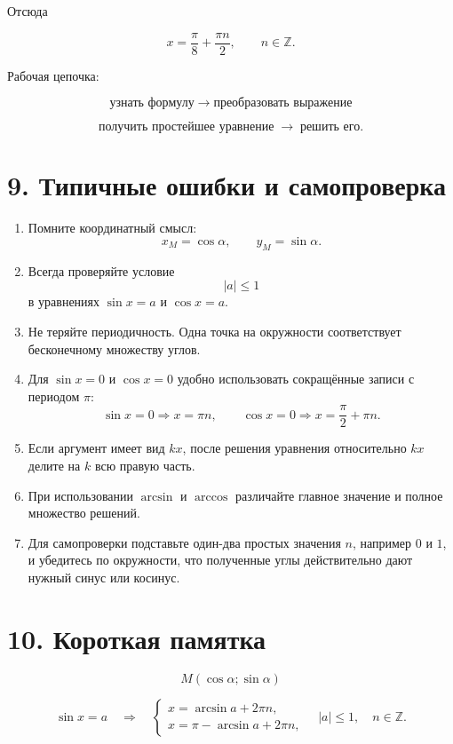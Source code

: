 \documentclass[a4paper,12pt]{article}
\newcommand{\Z}{\mathbb{Z}}
\begin{document}
Отсюда

\[
\boxed{x=\frac{\pi}{8}+\frac{\pi n}{2},
\qquad n\in\Z.}
\]

Рабочая цепочка:

\[
\text{узнать формулу}
\;\longrightarrow\;
\text{преобразовать выражение}
\]

\[
\text{получить простейшее уравнение}
\;\longrightarrow\;
\text{решить его}.
\]

\section{9. Типичные ошибки и самопроверка}

\begin{enumerate}
  \item Помните координатный смысл:
  \[
  x_M=\cos\alpha,
  \qquad
  y_M=\sin\alpha.
  \]

  \item Всегда проверяйте условие
  \[
  |a|\le1
  \]
  в уравнениях \(\sin x=a\) и \(\cos x=a\).

  \item Не теряйте периодичность. Одна точка на окружности соответствует бесконечному множеству углов.

  \item Для \(\sin x=0\) и \(\cos x=0\) удобно использовать сокращённые записи с периодом \(\pi\):
  \[
  \sin x=0\Rightarrow x=\pi n,
  \qquad
  \cos x=0\Rightarrow x=\frac{\pi}{2}+\pi n.
  \]

  \item Если аргумент имеет вид \(kx\), после решения уравнения относительно \(kx\) делите на \(k\) всю правую часть.

  \item При использовании \(\arcsin\) и \(\arccos\) различайте главное значение и полное множество решений.

  \item Для самопроверки подставьте один-два простых значения \(n\), например \(0\) и \(1\), и убедитесь по окружности, что полученные углы действительно дают нужный синус или косинус.
\end{enumerate}

\section{10. Короткая памятка}

\[
\boxed{M(\cos\alpha;\sin\alpha)}
\]

\[
\boxed{
\sin x=a\quad\Longrightarrow\quad
\begin{cases}
x=\arcsin a+2\pi n,\\
x=\pi-\arcsin a+2\pi n,
\end{cases}
\quad |a|\le1,
\quad n\in\Z.
}
\]
\end{document}
